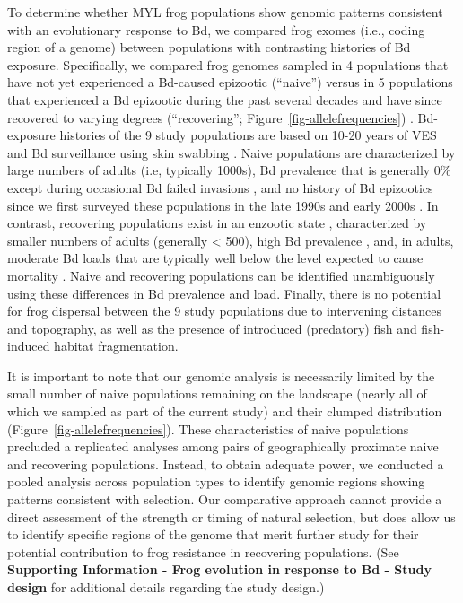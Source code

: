 \documentclass[9pt,twocolumn,twoside,lineno]{pnas-new}
\begin{document}
To determine whether MYL frog populations show genomic patterns
consistent with an evolutionary response to Bd, we compared frog exomes
(i.e., coding region of a genome) between populations with contrasting
histories of Bd exposure. Specifically, we compared frog genomes sampled
in 4 populations that have not yet experienced a Bd-caused epizootic
(``naive'') \citep{zhou2015} versus in 5 populations that experienced a
Bd epizootic during the past several decades and have since recovered to
varying degrees (``recovering''; Figure~\ref{fig-allelefrequencies})
\citep{knapp2016, vredenburg2010}. Bd-exposure histories of the 9 study
populations are based on 10-20 years of VES and Bd surveillance using
skin swabbing \citep[e.g.,][]{knapp2016, zhou2015, wilber2022}. Naive
populations are characterized by large numbers of adults (i.e, typically
1000s), Bd prevalence that is generally 0\% except during occasional Bd
failed invasions \citep[during which Bd loads remain very
low,][]{wilber2022}, and no history of Bd epizootics since we first
surveyed these populations in the late 1990s and early 2000s
\citep{zhou2015}. In contrast, recovering populations exist in an
enzootic state \citep{briggs2010}, characterized by smaller numbers of
adults (generally \textless{} 500), high Bd prevalence \citep[often
\textgreater{} 80\%,][]{knapp2011}, and, in adults, moderate Bd loads
that are typically well below the level expected to cause mortality
\citep{vredenburg2010}. Naive and recovering populations can be
identified unambiguously using these differences in Bd prevalence and
load. Finally, there is no potential for frog dispersal between the 9
study populations due to intervening distances and topography, as well
as the presence of introduced (predatory) fish and fish-induced habitat
fragmentation.

It is important to note that our genomic analysis is necessarily limited
by the small number of naive populations remaining on the landscape
(nearly all of which we sampled as part of the current study) and their
clumped distribution (Figure~\ref{fig-allelefrequencies}). These
characteristics of naive populations precluded a replicated analyses
among pairs of geographically proximate naive and recovering
populations. Instead, to obtain adequate power, we conducted a pooled
analysis across population types to identify genomic regions showing
patterns consistent with selection. Our comparative approach cannot
provide a direct assessment of the strength or timing of natural
selection, but does allow us to identify specific regions of the genome
that merit further study for their potential contribution to frog
resistance in recovering populations. (See \textbf{Supporting
Information - Frog evolution in response to Bd - Study design} for
additional details regarding the study design.)
\end{document}
